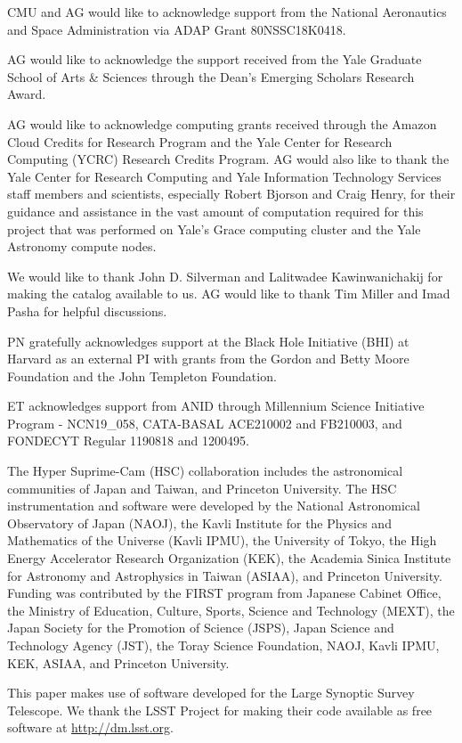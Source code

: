 CMU and AG would like to acknowledge support from the National Aeronautics and Space Administration via ADAP Grant 80NSSC18K0418. 

AG would like to acknowledge the support received from the Yale Graduate School of Arts \& Sciences through the Dean's Emerging Scholars Research Award.

AG would like to acknowledge computing grants received through the Amazon Cloud Credits for Research Program and the Yale Center for Research Computing (YCRC) Research Credits Program. AG would also like to thank the Yale Center for Research Computing and Yale Information Technology Services staff members and scientists, especially Robert Bjorson and Craig Henry, for their guidance and assistance in the vast amount of computation required for this project that was performed on Yale's Grace computing cluster and the Yale Astronomy compute nodes. 

We would like to thank John D. Silverman and Lalitwadee Kawinwanichakij for making the \citet{hsc_mass_size} catalog available to us. AG would like to thank Tim Miller and Imad Pasha for helpful discussions.

PN gratefully acknowledges support at the Black Hole Initiative (BHI) at Harvard as an external PI with grants from the Gordon and Betty Moore Foundation and the John Templeton Foundation.

ET acknowledges support from ANID through Millennium Science Initiative Program - NCN19\_058, CATA-BASAL ACE210002 and FB210003, and FONDECYT Regular 1190818 and 1200495.

The Hyper Suprime-Cam (HSC) collaboration includes the astronomical communities of Japan and Taiwan, and Princeton University. The HSC instrumentation and software were developed by the National Astronomical Observatory of Japan (NAOJ), the Kavli Institute for the Physics and Mathematics of the Universe (Kavli IPMU), the University of Tokyo, the High Energy Accelerator Research Organization (KEK), the Academia Sinica Institute for Astronomy and Astrophysics in Taiwan (ASIAA), and Princeton University. Funding was contributed by the FIRST program from Japanese Cabinet Office, the Ministry of Education, Culture, Sports, Science and Technology (MEXT), the Japan Society for the Promotion of Science (JSPS), Japan Science and Technology Agency (JST), the Toray Science Foundation, NAOJ, Kavli IPMU, KEK, ASIAA, and Princeton University. 

This paper makes use of software developed for the Large Synoptic Survey Telescope. We thank the LSST Project for making their code available as free software at  \href{http://dm.lsst.org}{http://dm.lsst.org}.

